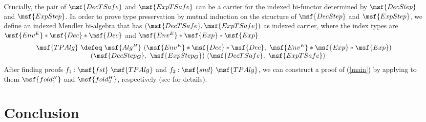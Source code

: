 \documentclass[submission,copyright,creativecommons]{eptcs}
\begin{document}
Crucially, the pair of $\msf{DecTSafe}$ and $\msf{ExpTSafe}$ can be a
carrier for the indexed bi-functor determined by $\msf{DecStep}$ and
$\msf{ExpStep}$. In order to prove type preservation by mutual
induction on the structure of $\msf{DecStep}$ and $\msf{ExpStep}$, we
define an indexed Mendler bi-algebra that has $(\msf{DecTSafe},
\msf{ExpTSafe})$ as indexed carrier, where the index types are
$\msf{Env^E} * \msf{Dec} * \msf{Dec}$ and $\msf{Env^E} * \msf{Exp} *
\msf{Exp}$
\begin{gather}  
\begin{array}{lll}
\msf{TPAlg} \ \defeq \ \msf{Alg^H} \ (\msf{Env^E} * \msf{Dec} *
\msf{Dec}, \ \msf{Env^E} * \msf{Exp} * \msf{Exp}) \\ \qquad \qquad
\qquad \qquad (\msf{DecStep_G}, \ \msf{ExpStep_G}) \ (\msf{DecTSafe},
\ \msf{ExpTSafe})
\end{array}
 \end{gather}  
After finding proofs $ f_1 : \msf{fst} \ \msf{TPAlg} $ and $ f_2 :
\msf{snd} \ \msf{TPAlg} $, we can construct a proof of (\ref{main}) by
applying to them $\msf{fold^H_1}$ and $\msf{fold^H_2}$, respectively
(see \cite{MACoq} for details).




\begin{comment}
 Mendler algebra

Definition subRedAlgebra (V W: Set) (h: DEq V) : prod Prop Prop :=
  H2MAlgebra (td3c V W) (te3c V W) 
      (bDTransY V W h) (bETransY V W h) 
      (bDTypeTrans V W h) (bETypeTrans V W h).

Definition subRedDecl (V W: Set) (h: DEq V) : Prop := 
  fst (subRedAlgebra V W h).

Definition subRedExp (V W: Set) (h: DEq V) : Prop := 
  snd (subRedAlgebra V W h).
\end{comment}



\section{Conclusion}
\end{document}
